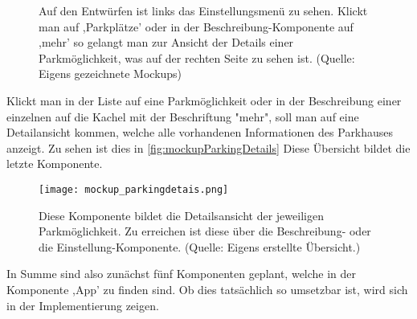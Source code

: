 \begin{figure}[h!]
	\centering
	\qquad
	\caption[Auf den Entwürfen ist links das Einstellungsmenü zu sehen. Klickt man auf ,Parkplätze' oder in der Beschreibung-Komponente auf ,mehr' so gelangt man zur Ansicht der Details einer Parkmöglichkeit, was auf der rechten Seite zu sehen ist.]{Auf den Entwürfen ist links das Einstellungsmenü zu sehen. Klickt man auf ,Parkplätze' oder in der Beschreibung-Komponente auf ,mehr' so gelangt man zur Ansicht der Details einer Parkmöglichkeit, was auf der rechten Seite zu sehen ist. (Quelle: Eigens gezeichnete Mockups)}
\label{fig:mockupSettings}
\label{fig:mockupParkingList}
\end{figure}
\newpage
Klickt man in der Liste auf eine Parkmöglichkeit oder in der Beschreibung einer einzelnen auf die Kachel mit der Beschriftung "mehr", soll man auf eine Detailansicht kommen, welche alle vorhandenen Informationen des Parkhauses anzeigt. Zu sehen ist dies in \autoref{fig:mockupParkingDetails} Diese Übersicht bildet die letzte Komponente. 

\begin{figure}[h!]
	\centering
	\texttt{[image: mockup\_parkingdetais.png]}
	\caption[Diese Komponente bildet die Detailsansicht der jeweiligen Parkmöglichkeit. Zu erreichen ist diese über die Beschreibung- oder die Einstellung-Komponente.]
	{Diese Komponente bildet die Detailsansicht der jeweiligen Parkmöglichkeit. Zu erreichen ist diese über die Beschreibung- oder die Einstellung-Komponente. (Quelle: Eigens erstellte Übersicht.)}
	\label{fig:mockupParkingDetails}
\end{figure}
\newpage
In Summe sind also zunächst fünf Komponenten geplant, welche in der Komponente ,App' zu finden sind. Ob dies tatsächlich so umsetzbar ist, wird sich in der Implementierung zeigen.

